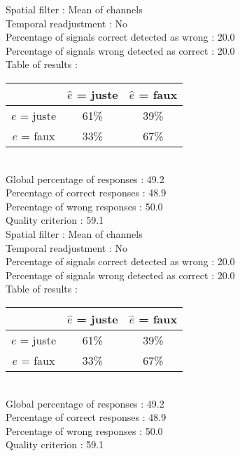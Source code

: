 Spatial filter : Mean of channels \\
Temporal readjustment : No \\
Percentage of signals correct detected as wrong :   20.0 \\
Percentage of signals wrong detected as correct :   20.0 \\
Table of results : \\
\begin{tabular}{|c|c|c|}
\hline				& $\hat{e}$ = juste & $\hat{e}$ = faux \\
\hline  $e$ = juste	&     61\%			&     39\%		\\
\hline  $e$ = faux	&     33\%			&     67\%		\\
\hline
\end{tabular}\\
Global percentage of responses :   49.2 \\
Percentage of correct responses :   48.9 \\
Percentage of wrong responses :   50.0 \\
Quality criterion :   59.1 \\

Spatial filter : Mean of channels \\
Temporal readjustment : No \\
Percentage of signals correct detected as wrong :   20.0 \\
Percentage of signals wrong detected as correct :   20.0 \\
Table of results : \\
\begin{tabular}{|c|c|c|}
\hline				& $\hat{e}$ = juste & $\hat{e}$ = faux \\
\hline  $e$ = juste	&     61\%			&     39\%		\\
\hline  $e$ = faux	&     33\%			&     67\%		\\
\hline
\end{tabular}\\
Global percentage of responses :   49.2 \\
Percentage of correct responses :   48.9 \\
Percentage of wrong responses :   50.0 \\
Quality criterion :   59.1 \\

